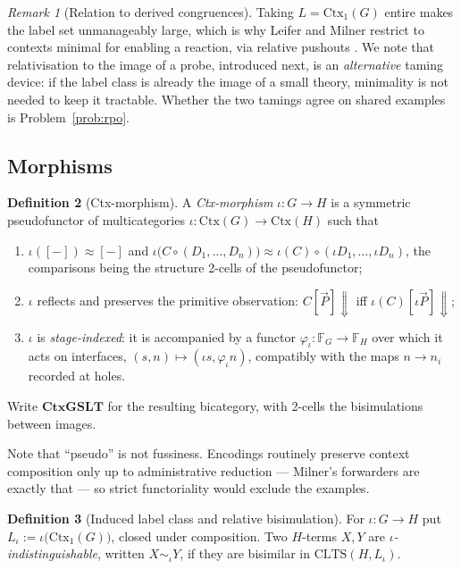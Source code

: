 \documentclass[11pt,a4paper]{article}
\theoremstyle{definition}
\newtheorem{definition}{Definition}[section]
\theoremstyle{plain}
\theoremstyle{remark}
\newtheorem{remark}[definition]{Remark}
\newcommand{\Ctx}{\mathrm{Ctx}}
\newcommand{\CtxGSLT}{\mathbf{CtxGSLT}}
\newcommand{\hole}{[-]}
\newcommand{\bisim}{\approx}
\newcommand{\obs}{\Downarrow}
\begin{document}
\begin{remark}[Relation to derived congruences]
\label{rem:rpo}
Taking $L = \Ctx_1(G)$ entire makes the label set unmanageably large, which is why
Leifer and Milner restrict to contexts minimal for enabling a reaction, via relative
pushouts \cite{leifer-milner,sewell,bigraphs}. We note that relativisation to the
image of a probe, introduced next, is an \emph{alternative} taming device: if the
label class is already the image of a small theory, minimality is not needed to keep
it tractable. Whether the two tamings agree on shared examples is
Problem~\ref{prob:rpo}.
\end{remark}

\subsection{Morphisms}

\begin{definition}[Ctx-morphism]
\label{def:ctxmor}
A \emph{Ctx-morphism} $\iota : G \to H$ is a symmetric pseudofunctor of
multicategories $\iota : \Ctx(G) \to \Ctx(H)$ such that
\begin{enumerate}[label=(\roman*),leftmargin=2.2em]
\item $\iota(\hole) \bisim \hole$ and
$\iota\bigl(C \circ (D_1,\dots,D_n)\bigr) \bisim \iota(C) \circ (\iota D_1,\dots,\iota D_n)$,
the comparisons being the structure 2-cells of the pseudofunctor;
\item $\iota$ reflects and preserves the primitive observation:
$C[\vec P] \obs$ iff $\iota(C)[\iota \vec P] \obs$;
\item $\iota$ is \emph{stage-indexed}: it is accompanied by a functor
$\varphi_\iota : \mathbb{F}_G \to \mathbb{F}_H$ over which it acts on interfaces,
$(s,n) \mapsto (\iota s, \varphi_\iota n)$, compatibly with the maps $n \to n_i$
recorded at holes.
\end{enumerate}
Write $\CtxGSLT$ for the resulting bicategory, with 2-cells the bisimulations
between images.
\end{definition}

Note that ``pseudo'' is not fussiness. Encodings routinely preserve context
composition only up to administrative reduction --- Milner's forwarders are exactly
that --- so strict functoriality would exclude the examples.

\begin{definition}[Induced label class and relative bisimulation]
\label{def:relbis}
For $\iota : G \to H$ put $L_\iota := \iota\bigl(\Ctx_1(G)\bigr)$, closed under
composition. Two $H$-terms $X,Y$ are \emph{$\iota$-indistinguishable}, written
$X \sim_\iota Y$, if they are bisimilar in $\mathrm{CLTS}(H, L_\iota)$.
\end{definition}
\end{document}
